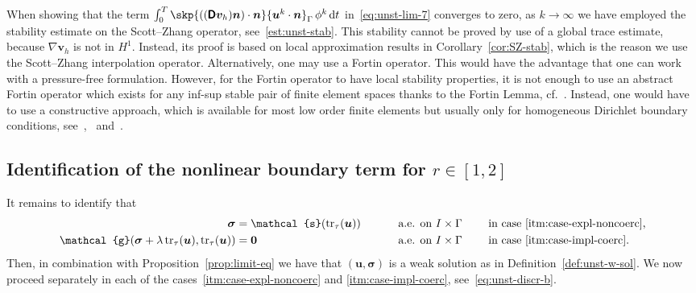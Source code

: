 \documentclass[reqno,a4paper]{amsart}
\def\tens#1{\pmb{\mathsf{#1}}}
\def\vec#1{\boldsymbol{#1}}
\def\tr{\mathop{\mathrm{tr}}\nolimits}
\def\d{{\rm d}}
\def\dt{\,\d t}
\def\b0{\vec{0}}
\def\bn{\vec{n}}
\def\bu{\vec{u}}
\def\bv{\vec{v}}
\def\bsigma{\vec{\sigma}}
\def\BD{\tens{D}}
\def\gbd{\vec{\mathcal{g}}}
\def\Srel{\vec{\mathcal{s}}}
\begin{document}
	\begin{remark}\label{rmk:local-fortin}  
		When showing that the term $\int_0^T \skp{   \left(( \BD \bv_h) \bn \right) \cdot \bn }{ \bu^{k} \cdot \bn }_{\Gamma}\, \phi^k \dt$ in~\eqref{eq:unst-lim-7} converges to zero, as $k\to \infty$ we have employed the stability estimate on the Scott--Zhang operator, see~\eqref{est:unst-stab}. 
		This stability cannot be proved by use of a global trace estimate, because $\nabla \bv_h$ is not in $H^1$. 
		Instead, its proof is based on local approximation results in Corollary~\ref{cor:SZ-stab}, which is the reason we use the Scott--Zhang interpolation operator. 
		Alternatively, one may use a Fortin operator. 
		This would have the advantage that one can work with a pressure-free formulation. 
		However, for the Fortin operator to have  local stability properties, it is not enough to use an abstract Fortin operator which exists for any inf-sup stable pair of finite element spaces thanks to the Fortin Lemma,  cf.~\cite[p.~217]{GiraultRaviart1986}. 
		Instead, one would have to use a constructive approach, which is available for most low order finite elements but usually only for homogeneous Dirichlet boundary conditions, see~\cite{BR.1985,GiraultScott2003},~\cite[Ch.~8]{BBF.2013,} and~\cite{DieningStornTscherpel2022}.
	\end{remark}
	
	\subsection{Identification of the nonlinear boundary term for $r \in [1,2]$}\label{sec:unst-id}
	It remains to identify that 
	\begin{alignat*}{3}
		\bsigma &= \Srel(\tr_{\tau} (\bu))  \qquad &&\text{ a.e. on } I\times \Gamma \qquad \text{ in case \ref{itm:case-expl-noncoerc},}\\
		\gbd(\bsigma + \lambda \tr_{\tau} (\bu), \tr_{\tau}(\bu))&=\b0 \qquad &&\text{ a.e. on } I\times \Gamma \qquad \text{ in case \ref{itm:case-impl-coerc}.}
	\end{alignat*}
	Then, in combination with Proposition~\ref{prop:limit-eq} we have that $(\bu,\bsigma)$ is a weak solution as in Definition~\ref{def:unst-w-sol}. 
	We now proceed separately in each of the cases~\ref{itm:case-expl-noncoerc} and \ref{itm:case-impl-coerc}, see~\eqref{eq:unst-discr-b}. 
	
\end{document}
